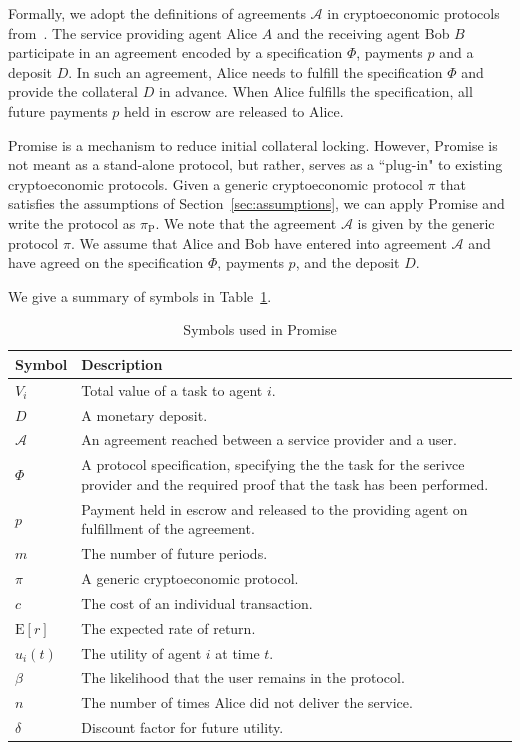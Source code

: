 \documentclass[runningheads]{llncs}
\newcommand{\sys}{Promise\xspace}
\begin{document}
Formally, we adopt the definitions of agreements $\mathcal{A}$ in cryptoeconomic protocols from~\cite{Harz2019Balance}.
The service providing agent Alice $A$ and the receiving agent Bob $B$ participate in an agreement encoded by a specification $\Phi$, payments $p$ and a deposit $D$.
In such an agreement, Alice needs to fulfill the specification $\Phi$ and provide the collateral $D$ in advance.
When Alice fulfills the specification, all future payments $p$ held in escrow are released to Alice.

\sys is a mechanism to reduce initial collateral locking.
However, \sys is not meant as a stand-alone protocol, but rather, serves as a ``plug-in" to existing cryptoeconomic protocols.
Given a generic cryptoeconomic protocol $\pi$ that satisfies the assumptions of Section~\ref{sec:assumptions}, we can apply \sys and write the protocol as $\pi_{\mathrm{P}}$.
We note that the agreement $\mathcal{A}$ is given by the generic protocol $\pi$.
We assume that Alice and Bob have entered into agreement $\mathcal{A}$ and have agreed on the specification $\Phi$, payments $p$, and the deposit $D$.

We give a summary of symbols in Table~\ref{tab:symbols}.

\begin{table}[ht]
\centering
\caption{Symbols used in \sys}
\label{tab:symbols}
\begin{tabularx}{\textwidth}{lX}
\toprule 
\textbf{Symbol} & \textbf{Description} \\ \toprule
$V_{i}$ & Total value of a task to agent $i$. \\ 
$D$ & A monetary deposit. \\
$\mathcal{A}$ & An agreement reached between a service provider and a user. \\
$\Phi$ & A protocol specification, specifying the the task for the serivce provider and the required proof that the task has been performed. \\
$p$ & Payment held in escrow and released to the providing agent on fulfillment of the agreement. \\
$m$ & The number of future periods. \\
$\pi$ & A generic cryptoeconomic protocol. \\
$c$ & The cost of an individual transaction. \\
$\mathrm{E}[r]$ & The expected rate of return. \\
$u_i(t)$ & The utility of agent $i$ at time $t$. \\
$\beta$ & The likelihood that the user remains in the protocol. \\
$n$ & The number of times Alice did not deliver the service. \\
$\delta$ & Discount factor for future utility. \\
\bottomrule
\end{tabularx}
\end{table}
\end{document}
